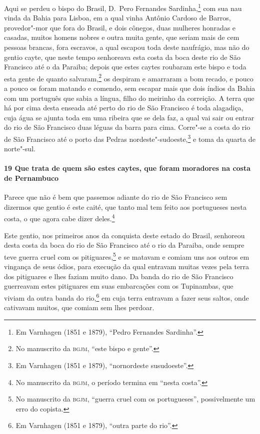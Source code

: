 \begin{linenumbers}
Aqui se perdeu o bispo do Brasil, D.~Pero Fernandes Sardinha,\footnote{ Em Varnhagen (1851
e 1879), ``Pedro Fernandes Sardinha''.} com sua nau vinda da Bahia para Lisboa, em a qual
vinha Antônio Cardoso de Barros, provedor"-mor que fora do Brasil, e dois cônegos, duas
mulheres honradas e casadas, muitos homens nobres e outra muita gente, que seriam mais de
cem pessoas brancas, fora escravos, a qual escapou toda deste naufrágio, mas não do gentio
cayte, que neste tempo senhoreava esta costa da boca deste rio de São Francisco até o da
Paraiba; depois que estes caytes roubaram este bispo e toda esta gente de quanto
salvaram,\footnote{ No manuscrito da \textsc{bgjm}, ``este bispo e gente''.} os despiram e
amarraram a bom recado, e pouco a pouco os foram matando e comendo, sem escapar mais que
dois índios da Bahia com um português que sabia a língua, filho do meirinho da correição.
A terra que há por cima desta enseada até perto do rio de São Francisco é toda alagadiça,
cuja água se ajunta toda em uma ribeira que se dela faz, a qual vai sair ou entrar do rio
de São Francisco duas léguas da barra para cima. Corre"-se a costa do rio de São Francisco
até o porto das Pedras nordeste"-sudoeste,\footnote{ Em Varnhagen (1851 e 1879),
``nornordeste susudoeste''.} e toma da quarta de norte"-sul.

\paragraph{19 Que trata de quem são estes caytes, que foram moradores na costa de
Pernambuco} \quad
Parece que não é bem que passemos adiante do rio de São Francisco sem dizermos que gentio
é este caité, que tanto mal tem feito aos portugueses nesta costa, o que agora cabe dizer
deles.\footnote{ No manuscrito da \textsc{bgjm}, o período termina em ``nesta costa''.}

Este gentio, nos primeiros anos da conquista deste estado do Brasil, senhoreou desta costa
da boca do rio de São Francisco até o rio da Paraiba, onde sempre teve guerra cruel com os
pitiguares,\footnote{ No manuscrito da \textsc{bgjm}, ``guerra cruel com os portugueses'',
possivelmente um erro do copista.} e se matavam e comiam uns aos outros em vingança de
seus ódios, para execução da qual entravam muitas vezes pela terra dos pitiguares e lhes
faziam muito dano. Da banda do rio de São Francisco guerreavam estes pitiguares em suas
embarcações com os Tupinambas, que viviam da outra banda do rio,\footnote{ Em Varnhagen
(1851 e 1879), ``outra parte do rio''.} em cuja terra entravam a fazer seus saltos, onde
cativavam muitos, que comiam sem lhes perdoar.


\end{linenumbers}
